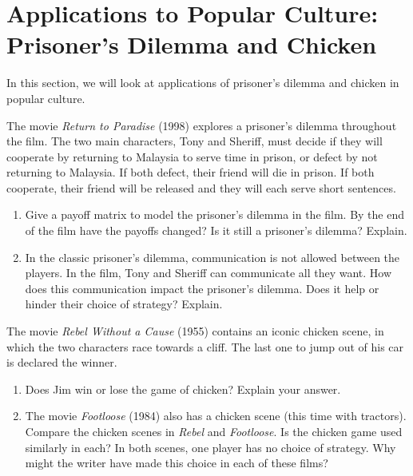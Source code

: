 
\section{Applications to Popular Culture: Prisoner's Dilemma and Chicken}



\vspace{.1in}
In this section, we will look at applications of prisoner's dilemma and chicken in popular culture.


The movie {\it Return to Paradise} (1998) explores a prisoner's dilemma throughout the film.  The two main characters, Tony and Sheriff, must decide if they will cooperate by returning to Malaysia to serve time in prison, or defect by not returning to Malaysia. If both defect, their friend will die in prison. If both cooperate, their friend will be released and they will each serve short sentences.

\begin{enumerate}
\item Give a payoff matrix to model the prisoner's dilemma in the film. By the end of the film have the payoffs changed? Is it still a prisoner's dilemma? Explain.

\item In the classic prisoner's dilemma, communication is not allowed between the players. In the film, Tony and Sheriff can communicate all they want. How does this communication impact the prisoner's dilemma. Does it help or hinder their choice of strategy? Explain.

\end{enumerate}

The movie {\it Rebel Without a Cause} (1955) contains an iconic chicken scene, in which the two characters race towards a cliff. The last one to jump out of his car is declared the winner.

\begin{enumerate}

\item Does Jim win or lose the game of chicken? Explain your answer. 

\item The movie {\it Footloose} (1984) also has a chicken scene (this time with tractors). Compare the chicken scenes in {\it Rebel} and {\it Footloose}. Is the chicken game used similarly in each? In both scenes, one player has no choice of strategy. Why might the writer have made this choice in each of these films?

\end{enumerate}

